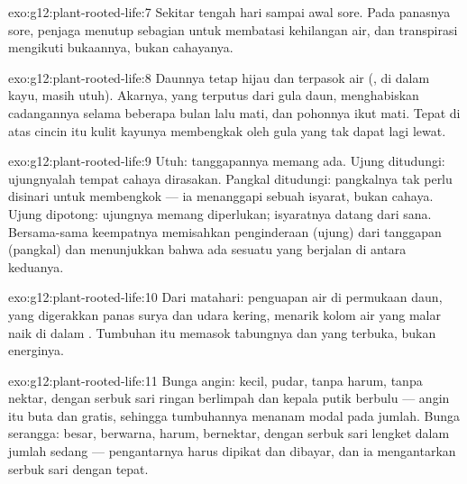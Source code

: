 \begin{solution}{exo:g12:plant-rooted-life:7}
Sekitar tengah hari sampai awal sore. Pada panasnya sore,  penjaga
menutup  sebagian untuk membatasi kehilangan air, dan
transpirasi mengikuti bukaannya, bukan cahayanya.
\end{solution}

\begin{solution}{exo:g12:plant-rooted-life:8}
Daunnya tetap hijau dan terpasok air (, di dalam kayu, masih
utuh). Akarnya, yang terputus dari gula daun, menghabiskan cadangannya
selama beberapa bulan lalu mati, dan pohonnya ikut mati. Tepat di atas
cincin itu kulit kayunya membengkak oleh gula yang tak dapat lagi
lewat.
\end{solution}

\begin{solution}{exo:g12:plant-rooted-life:9}
Utuh: tanggapannya memang ada. Ujung ditudungi: ujungnyalah tempat
cahaya dirasakan. Pangkal ditudungi: pangkalnya tak perlu disinari
untuk membengkok --- ia menanggapi sebuah isyarat, bukan cahaya. Ujung
dipotong: ujungnya memang diperlukan; isyaratnya datang dari sana.
Bersama-sama keempatnya memisahkan penginderaan (ujung) dari tanggapan
(pangkal) dan menunjukkan bahwa ada sesuatu yang berjalan di antara
keduanya.
\end{solution}

\begin{solution}{exo:g12:plant-rooted-life:10}
Dari matahari: penguapan air di permukaan daun, yang digerakkan panas
surya dan udara kering, menarik kolom air yang malar naik di dalam
. Tumbuhan itu memasok tabungnya dan  yang terbuka, bukan
energinya.
\end{solution}

\begin{solution}{exo:g12:plant-rooted-life:11}
Bunga angin: kecil, pudar, tanpa harum, tanpa nektar, dengan serbuk
sari ringan berlimpah dan kepala putik berbulu --- angin itu buta dan
gratis, sehingga tumbuhannya menanam modal pada jumlah. Bunga
serangga: besar, berwarna, harum, bernektar, dengan serbuk sari
lengket dalam jumlah sedang --- pengantarnya harus dipikat dan dibayar,
dan ia mengantarkan serbuk sari dengan tepat.
\end{solution}

